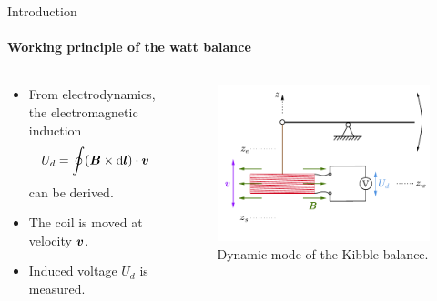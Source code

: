 \documentclass{beamer}
\begin{document}
\begin{frame}[allowframebreaks]{Introduction}
\framesubtitle{Working principle of the watt balance}
  \begin{columns}
    \begin{column}{0.49\textwidth}
    \begin{itemize}
        \item From electrodynamics, the electromagnetic induction \begin{equation}
            \label{eq:electromagnetic_induction}
            U_d = \oint(\bm{B}\times \mathrm{d}\bm{l})\cdot \bm{v}
        \end{equation} can be derived.
    \item The coil is moved at velocity $\bm{v}$.
    \item Induced voltage $U_d$ is measured.
    \end{itemize}
    \end{column}
    
    \begin{column}{0.5\textwidth}
      \begin{figure}[h!] 
		\centering
		\includegraphics[width=\textwidth]{figures/balancedynamic.pdf}
		\caption{Dynamic mode of the Kibble balance.}
		\label{fig:balancedynamic}
      \end{figure}
    \end{column}
  \end{columns}
\end{frame}
\end{document}
